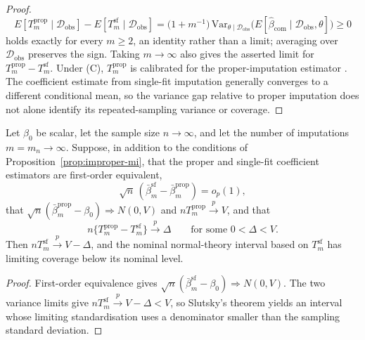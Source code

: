 \begin{proof}
\[
E[T_m^{\mathrm{prop}}\mid\mathcal{D}_{\mathrm{obs}}]-E[T_m^{\mathrm{sf}}\mid\mathcal{D}_{\mathrm{obs}}]=\bigl(1+m^{-1}\bigr)\,\mathrm{Var}_{\theta\mid\mathcal{D}_{\mathrm{obs}}}\!\bigl(E[\hat{\beta}_{\mathrm{com}}\mid\mathcal{D}_{\mathrm{obs}},\theta]\bigr)\ge0
\]
holds exactly for every $m\ge2$, an identity rather than a limit; averaging over $\mathcal{D}_{\mathrm{obs}}$ preserves the sign. Taking $m\to\infty$ also gives the asserted limit for $T_m^{\mathrm{prop}}-T_m^{\mathrm{sf}}$. Under (C), $T_m^{\mathrm{prop}}$ is calibrated for the proper-imputation estimator \citep{Rubin1987,meng1994multiple}. The coefficient estimate from single-fit imputation generally converges to a different conditional mean, so the variance gap relative to proper imputation does not alone identify its repeated-sampling variance or coverage.
\end{proof}

\begin{proposition}\label{prop:improper-mi-coverage}
Let $\beta_0$ be scalar, let the sample size $n\to\infty$, and let the number of imputations $m=m_n\to\infty$. Suppose, in addition to the conditions of Proposition~\ref{prop:improper-mi}, that the proper and single-fit coefficient estimators are first-order equivalent,
\[
\sqrt n\,(\bar\beta_m^{\mathrm{sf}}-\bar\beta_m^{\mathrm{prop}})=o_p(1),
\]
that $\sqrt n(\bar\beta_m^{\mathrm{prop}}-\beta_0)\Rightarrow N(0,V)$ and $nT_m^{\mathrm{prop}}\xrightarrow{p}V$, and that
\[
n\{T_m^{\mathrm{prop}}-T_m^{\mathrm{sf}}\}\xrightarrow{p}\Delta
\qquad\text{for some }0<\Delta<V.
\]
Then $nT_m^{\mathrm{sf}}\xrightarrow{p}V-\Delta$, and the nominal normal-theory interval based on $T_m^{\mathrm{sf}}$ has limiting coverage below its nominal level.
\end{proposition}

\begin{proof}
First-order equivalence gives $\sqrt n(\bar\beta_m^{\mathrm{sf}}-\beta_0)\Rightarrow N(0,V)$. The two variance limits give $nT_m^{\mathrm{sf}}\xrightarrow{p}V-\Delta<V$, so Slutsky's theorem yields an interval whose limiting standardisation uses a denominator smaller than the sampling standard deviation.
\end{proof}

